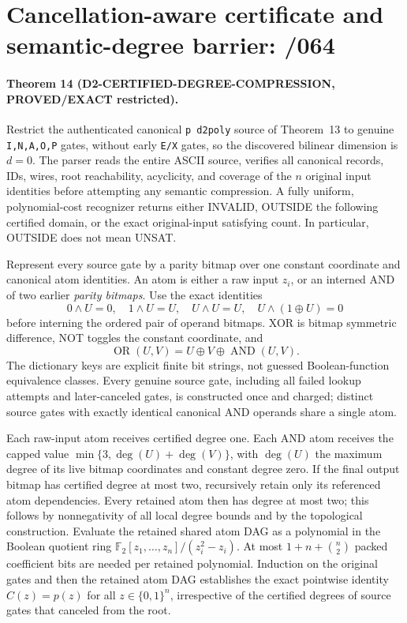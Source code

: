 \documentclass[11pt]{article}
\begin{document}
\section{Cancellation-aware certificate and semantic-degree barrier: /064}
\paragraph{Theorem 14 (D2-CERTIFIED-DEGREE-COMPRESSION, PROVED/EXACT restricted).}
Restrict the authenticated canonical \texttt{p d2poly} source of Theorem~13
to genuine \texttt{I,N,A,O,P} gates, without early
\texttt{E/X} gates, so the discovered bilinear dimension is \(d=0\).
The parser reads the entire ASCII source, verifies all canonical records,
IDs, wires, root reachability, acyclicity, and coverage of the \(n\)
original input identities before attempting any semantic compression.
A fully uniform, polynomial-cost recognizer returns either INVALID,
OUTSIDE the following certified domain, or the exact original-input
satisfying count.  In particular, OUTSIDE does not mean UNSAT.

Represent every source gate by a parity bitmap over one constant
coordinate and canonical atom identities.  An atom is either a raw input
\(z_i\), or an interned AND of two earlier \emph{parity bitmaps}.
Use the exact identities
\[
0\land U=0,\quad 1\land U=U,\quad
U\land U=U,\quad U\land(1\oplus U)=0
\]
before interning the ordered pair of operand bitmaps.  XOR is bitmap
symmetric difference, NOT toggles the constant coordinate, and
\[
\operatorname{OR}(U,V)=
 U\oplus V\oplus\operatorname{AND}(U,V).
\]
The dictionary keys are explicit finite bit strings, not guessed
Boolean-function equivalence classes.  Every genuine source gate,
including all failed lookup attempts and later-canceled gates, is
constructed once and charged; distinct source gates with exactly
identical canonical AND operands share a single atom.

Each raw-input atom receives certified degree one.  Each AND atom
receives the capped value
\(\min\{3,\deg(U)+\deg(V)\}\), with
\(\deg(U)\) the maximum degree of its live bitmap coordinates and
constant degree zero.  If the final output bitmap has certified degree
at most two, recursively retain only its referenced atom dependencies.
Every retained atom then has degree at most two; this follows by
nonnegativity of all local degree bounds and by the topological
construction.  Evaluate the retained shared atom DAG as a polynomial
in the Boolean quotient ring
\(\mathbb F_2[z_1,\ldots,z_n]/(z_i^2-z_i)\).
At most \(1+n+\binom n2\) packed coefficient bits are needed per
retained polynomial.  Induction on the original gates and then the
retained atom DAG establishes the exact pointwise identity
\(C(z)=p(z)\) for all \(z\in\{0,1\}^n\), irrespective of the
certified degrees of source gates that canceled from the root.
\end{document}

